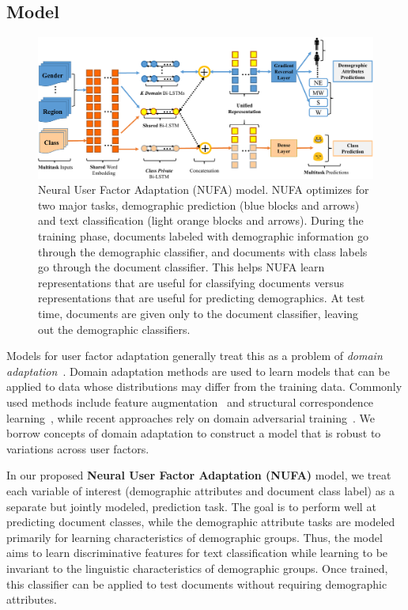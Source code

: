 \subsection{Model}
\label{chap4:subsec:model}

\begin{figure}[htp]
\centering
\includegraphics[width=1\textwidth]{./images/chapter4/model.pdf}
\caption{Neural User Factor Adaptation (NUFA) model. 
NUFA optimizes for two major tasks, demographic prediction (blue blocks and arrows) and text classification (light orange blocks and arrows). 
During the training phase, documents labeled with demographic information go through the demographic classifier, and documents with class labels go through the document classifier. 
This helps NUFA learn representations that are useful for classifying documents versus representations that are useful for predicting demographics.
At test time, documents are given only to the document classifier, leaving out the demographic classifiers.
}
\label{chap4:fig:model}
\end{figure}

Models for user factor adaptation generally treat
this as a problem of {\em domain adaptation}~\cite{volkova2013exploring,lynn2017human}.
Domain adaptation methods are used to learn models that can be applied to data whose distributions may differ from the training data.
Commonly used methods include feature augmentation~\cite{daume2007frustratingly, joshi2013s, huang2018examining}
and structural correspondence learning~\cite{blitzer2006domain},
while recent approaches rely on 
domain adversarial training~\cite{ganin2016domain, chen2016adversarial, liu2017adversarial, huang2018modeling}. 
We borrow concepts of domain adaptation to construct a model that is robust to variations across user factors.


In our proposed {\bf Neural User Factor Adaptation (NUFA)} model, we treat each variable of interest (demographic attributes and document class label) as a separate but jointly modeled, prediction task.
The goal is to perform well at predicting document classes, while the demographic attribute tasks are modeled primarily for learning characteristics of demographic groups.
Thus, the model aims to learn discriminative features for text classification while learning to be invariant to the linguistic characteristics of demographic groups. 
Once trained, this classifier can be applied to test documents without requiring demographic attributes.


